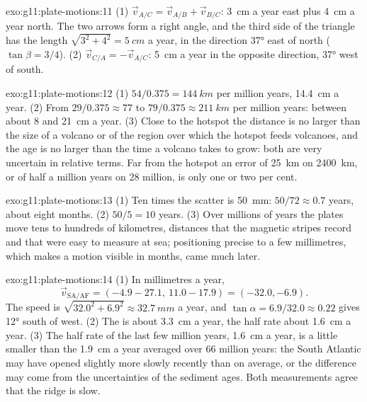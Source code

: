 \begin{solution}{exo:g11:plate-motions:11}
(1) $\vec v_{A/C} = \vec v_{A/B} + \vec v_{B/C}$: \qty{3}{cm} a year east plus
\qty{4}{cm} a year north. The two arrows form a right angle, and the third
side of the triangle has the length $\sqrt{3^2 + 4^2} = \qty{5}{cm}$ a year,
in the direction \ang{37} east of north ($\tan\beta = 3/4$). (2) $\vec v_{C/A}
= -\vec v_{A/C}$: \qty{5}{cm} a year in the opposite direction, \ang{37} west
of south.
\end{solution}

\begin{solution}{exo:g11:plate-motions:12}
(1) $54/0.375 = \qty{144}{km}$ per million years, \qty{14.4}{cm} a year. (2)
From $29/0.375 \approx 77$ to $79/0.375 \approx \qty{211}{km}$ per million
years: between about 8 and \qty{21}{cm} a year. (3) Close to the hotspot the
distance is no larger than the size of a volcano or of the region over which
the hotspot feeds volcanoes, and the age is no larger than the time a volcano
takes to grow: both are very uncertain in relative terms. Far from the
hotspot an error of \qty{25}{km} on \qty{2400}{km}, or of half a million years
on 28 million, is only one or two per cent.
\end{solution}

\begin{solution}{exo:g11:plate-motions:13}
(1) Ten times the scatter is \qty{50}{mm}: $50/72 \approx 0.7$ years, about
eight months. (2) $50/5 = 10$ years. (3) Over millions of years the plates move
tens to hundreds of kilometres, distances that the magnetic stripes record and
that were easy to measure at sea; positioning precise to a few millimetres,
which makes a motion visible in months, came much later.
\end{solution}

\begin{solution}{exo:g11:plate-motions:14}
(1) In millimetres a year,
\[
  \vec v_{\mathrm{SA/AF}} = (-4.9 - 27.1,\ 11.0 - 17.9) = (-32.0, -6.9).
\] The speed is $\sqrt{32.0^2 + 6.9^2} \approx
\qty{32.7}{mm}$ a year, and $\tan\alpha = 6.9/32.0 \approx 0.22$ gives
\ang{12} south of west. (2) The  is about \qty{3.3}{cm} a
year, the half rate about \qty{1.6}{cm} a year. (3) The half rate of the last
few million years, \qty{1.6}{cm} a year, is a little smaller than the
\qty{1.9}{cm} a year averaged over 66 million years: the South Atlantic may
have opened slightly more slowly recently than on average, or the difference
may come from the uncertainties of the sediment ages. Both measurements agree
that the ridge is slow.
\end{solution}

